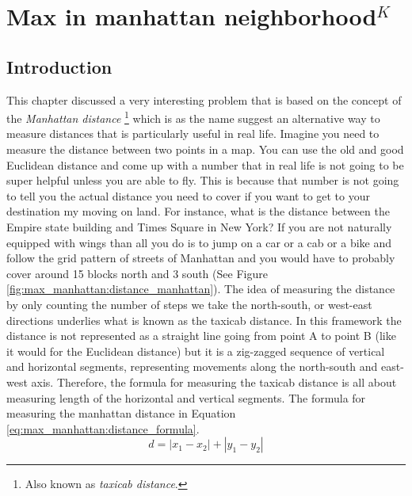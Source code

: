 %



\chapter{Max in manhattan neighborhood$^{K}$}
\label{ch:max_manhattan}
\section*{Introduction}
This chapter discussed a very interesting problem that is based on the concept of the
\textit{Manhattan distance} \footnote{Also known as \textit{taxicab distance}.} which is as the name
suggest an alternative way to measure distances that is particularly useful in real life. Imagine
you need to measure the distance between two points in a map. You can use the old and good Euclidean
distance and come up with a number that in real life is not going to be super helpful unless you are
able to fly. This is because that number is not going to tell you the actual distance you need to
cover if you want to get to your destination my moving on land. For instance, what is the distance
between the Empire state building and Times Square in New York? If you are not naturally equipped
with wings than all you do is to jump on a car or a cab or a bike and follow the grid pattern of
streets of Manhattan and you would have to probably cover around 15 blocks north and 3 south (See
Figure \ref{fig:max_manhattan:distance_manhattan}). The idea of measuring the distance by only
counting the number of steps we take the north-south, or west-east directions underlies what is
known as the taxicab distance. In this framework the distance is not represented as a straight line
going from point A to point B (like it would for the Euclidean distance) but it is a zig-zagged
sequence of vertical and horizontal segments, representing movements along the north-south and
east-west axis. Therefore, the formula for measuring the taxicab distance is all about measuring
length of the horizontal and vertical segments. The formula for measuring the manhattan distance in
Equation \ref{eq:max_manhattan:distance_formula}.
\begin{equation}
	d = |x_1-x_2|+|y_1-y_2|
	\label{eq:max_manhattan:distance_formula}
\end{equation}

